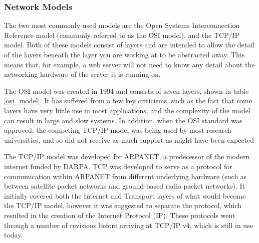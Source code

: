 \documentclass[12pt, a4paper, twoside, onecolumn]{article}
\begin{document}
\subsubsection{Network Models}
\label{network_models}
The two most commonly used models are the Open Systems Interconnection Reference model (commonly referred to as the OSI model), and the TCP/IP model. Both of these models consist of layers and are intended to allow the detail of the layers beneath the layer you are working at to be abstracted away. This means that, for example, a web server will not need to know any detail about the networking hardware of the server it is running on.

The OSI model was created in 1994 \cite{iec7498_1_1994} and consists of seven layers, shown in table \ref{osi_model}. It has suffered from a few key criticisms, such as the fact that some layers have very little use in most applications, and the complexity of the model can result in large and slow systems. In addition, when the OSI standard was approved, the competing TCP/IP model was being used by most research universities, and so did not receive as much support as might have been expected

The TCP/IP model was developed for ARPANET, a predecessor of the modern internet funded by DARPA. TCP was developed to serve as a protocol for communication within ARPANET from different underlying hardware (such as between satellite packet networks and ground-based radio packet networks). It initially covered both the Internet and Transport layers of what would become the TCP/IP model, however it was suggested to separate the protocol, which resulted in the creation of the Internet Protocol (IP). These protocols went through a number of revisions before arriving at TCP/IP v4, which is still in use today.
\end{document}
